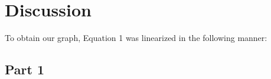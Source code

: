 \documentclass[letterpaper]{article}
\begin{document}
%
%
%
%

\section{Discussion}

To obtain our graph, Equation 1 was linearized in the following manner:
\subsection{Part 1}
\end{document}

